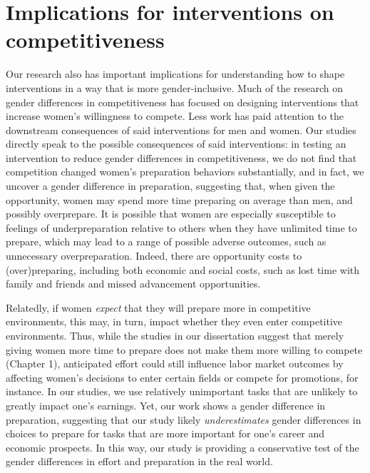 \documentclass[letterpaper, nobind]{templates/ociamthesis}
\begin{document}
\hypertarget{implications-for-interventions-on-competitiveness}{%
\section{Implications for interventions on competitiveness}\label{implications-for-interventions-on-competitiveness}}

Our research also has important implications for understanding how to shape interventions in a way that is more gender-inclusive. Much of the research on gender differences in competitiveness has focused on designing interventions that increase women's willingness to compete. Less work has paid attention to the downstream consequences of said interventions for men and women. Our studies directly speak to the possible consequences of said interventions: in testing an intervention to reduce gender differences in competitiveness, we do not find that competition changed women's preparation behaviors substantially, and in fact, we uncover a gender difference in preparation, suggesting that, when given the opportunity, women may spend more time preparing on average than men, and possibly overprepare.
It is possible that women are especially susceptible to feelings of underpreparation relative to others when they have unlimited time to prepare, which may lead to a range of possible adverse outcomes, such as unnecessary overpreparation. Indeed, there are opportunity costs to (over)preparing, including both economic and social costs, such as lost time with family and friends and missed advancement opportunities.

Relatedly, if women \emph{expect} that they will prepare more in competitive environments, this may, in turn, impact whether they even enter competitive environments. Thus, while the studies in our dissertation suggest that merely giving women more time to prepare does not make them more willing to compete (Chapter 1), anticipated effort could still influence labor market outcomes by affecting women's decisions to enter certain fields or compete for promotions, for instance. In our studies, we use relatively unimportant tasks that are unlikely to greatly impact one's earnings. Yet, our work shows a gender difference in preparation, suggesting that our study likely \emph{underestimates} gender differences in choices to prepare for tasks that are more important for one's career and economic prospects. In this way, our study is providing a conservative test of the gender differences in effort and preparation in the real world.
\end{document}
